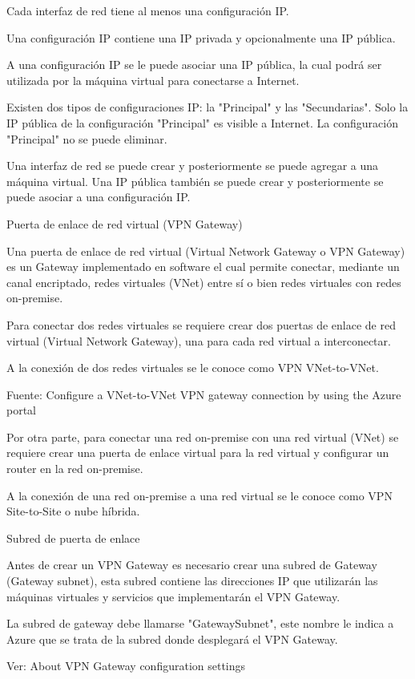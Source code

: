 Cada interfaz de red tiene al menos una configuración IP.

Una configuración IP contiene una IP privada y opcionalmente una IP pública.

A una configuración IP se le puede asociar una IP pública, la cual podrá ser utilizada por la máquina virtual para conectarse a Internet.

Existen dos tipos de configuraciones IP: la "Principal" y las "Secundarias". Solo la IP pública de la configuración "Principal" es visible a Internet. La configuración "Principal" no se puede eliminar.

Una interfaz de red se puede crear y posteriormente se puede agregar a una máquina virtual. Una IP pública también se puede crear y posteriormente se puede asociar a una configuración IP.

Puerta de enlace de red virtual (VPN Gateway)

Una puerta de enlace de red virtual (Virtual Network Gateway o VPN Gateway) es un Gateway implementado en software el cual permite conectar, mediante un canal encriptado, redes virtuales (VNet) entre sí o bien redes virtuales con redes on-premise.

Para conectar dos redes virtuales se requiere crear dos puertas de enlace de red virtual (Virtual Network Gateway), una para cada red virtual a interconectar.

A la conexión de dos redes virtuales se le conoce como VPN VNet-to-VNet.

Fuente: Configure a VNet-to-VNet VPN gateway connection by using the Azure portal

Por otra parte, para conectar una red on-premise con una red virtual (VNet) se requiere crear una puerta de enlace virtual para la red virtual y configurar un router en la red on-premise.

A la conexión de una red on-premise a una red virtual se le conoce como VPN Site-to-Site o nube híbrida.

Subred de puerta de enlace

Antes de crear un VPN Gateway es necesario crear una subred de Gateway (Gateway subnet), esta subred contiene las direcciones IP que utilizarán las máquinas virtuales y servicios que implementarán el VPN Gateway.

La subred de gateway debe llamarse "GatewaySubnet", este nombre le indica a Azure que se trata de la subred donde desplegará el VPN Gateway.

Ver: About VPN Gateway configuration settings

